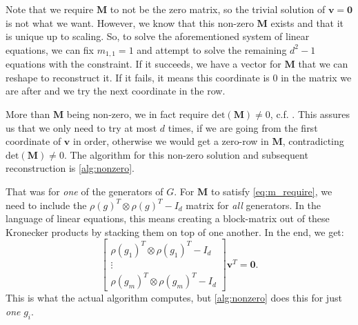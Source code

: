 \documentclass[11pt]{article}
\begin{document}
Note that we require $\mathbf{M}$ to not be the zero matrix, so the trivial solution of $\mathbf{v} = \mathbf{0}$
is not what we want. However, we know that this non-zero $\mathbf{M}$ exists and that it is unique
up to scaling. So, to solve the aforementioned system of linear equations, we can fix $m_{1,1} = 1$
and attempt to solve the remaining $d^2-1$ equations with the constraint. If it succeeds, we have
a vector for $\mathbf{M}$ that we can reshape to reconstruct it. If it fails, it means this coordinate
is $0$ in the matrix we are after and we try the next coordinate in the row.

More than $\mathbf{M}$ being non-zero, we in fact require $\text{det}(\mathbf{M}) \neq 0$, c.f. \cite[Proof of Lemma 3.1]{Pas21}.
This assures us that we only need to try at most $d$ times, if we are going from the first coordinate
of $\mathbf{v}$ in order, otherwise we would get a zero-row in $\mathbf{M}$, contradicting $\text{det}(\mathbf{M}) \neq 0$.
The algorithm for this non-zero solution and subsequent reconstruction is \cref{alg:nonzero}.

That was for \textit{one} of the generators of $G$. For $\mathbf{M}$ to satisfy \cref{eq:m_require},
we need to include the $\rho(g)^T \otimes \rho(g)^T - I_d$ matrix for \textit{all} generators. In
the language of linear equations, this means creating a block-matrix out of these Kronecker products
by stacking them on top of one another. In the end, we get:
\[\begin{bmatrix} \rho(g_1)^T \otimes \rho(g_1)^T - I_d\\ \vdots \\ \rho(g_m)^T \otimes \rho(g_m)^T - I_d\end{bmatrix} \mathbf{v}^T = \mathbf{0}.\]
This is what the actual algorithm computes, but \cref{alg:nonzero} does this for just \textit{one} $g_i$.
\end{document}
